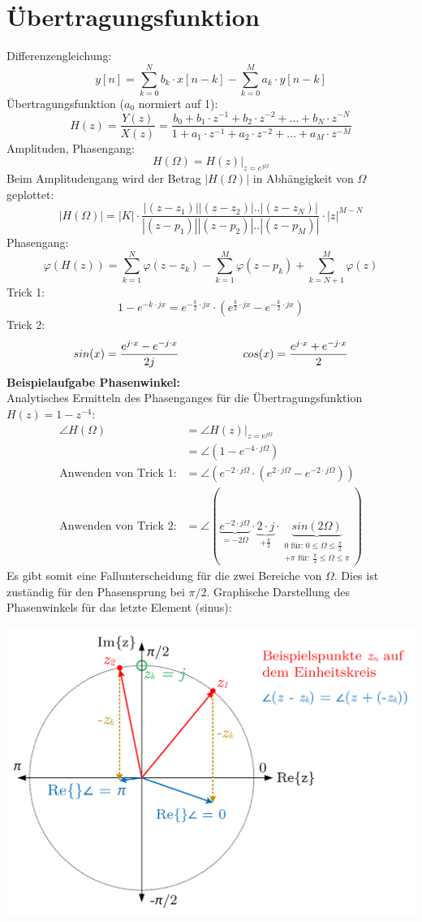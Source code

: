 \section{Übertragungsfunktion}
Differenzengleichung:
\[y[n] = \sum_{k=0}^{N}b_k \cdot x[n-k]-\sum_{k=0}^{M} a_k \cdot y[n-k]\]
Übertragungsfunktion ($a_0$ normiert auf 1):
\[ H(z) = \frac{Y(z)}{X(z)} =
\frac{b_0+b_1 \cdot z^{-1} + b_2 \cdot z^{-2}+\ldots+b_N \cdot z^{-N}}
	{1+a_1 \cdot z^{-1} + a_2 \cdot z^{-2}+\ldots+a_M \cdot z^{-M}} \]
Amplituden, Phasengang:
\[ H(\Omega)=H(z)\big|_{z=e^{j\Omega}} \]
Beim Amplitudengang wird der Betrag $\big| H(\Omega)\big|$ in Abhängigkeit von $\Omega$ geplottet:\\
\[ \big| H(\Omega)\big| =  |K| \cdot \frac{|(z-z_1)||(z-z_2)|..|(z-z_N)|}
								{|(z-p_1)||(z-p_2)|..|(z-p_M)|}
								\cdot |z|^{M-N} \]
Phasengang: \[ \varphi(H(z)) = \sum_{k=1}^{N} \varphi(z-z_k) 
								-\sum_{k=1}^{M} \varphi(z-p_k)
								+\sum_{k=N+1}^{M} \varphi(z)  \]
Trick 1:
\[ 1-e^{-k \cdot jx} = e^{-\frac{k}{2} \cdot jx} \cdot (e^{\frac{k}{2} \cdot jx} - e^{-\frac{k}{2} \cdot jx})\]
Trick 2:
\[ sin(x)= \frac{e^{j \cdot x}-e^{-j \cdot x}}{2j} \hspace{20mm} 
cos(x)= \frac{e^{j \cdot x}+e^{-j \cdot x}}{2} \]
\textbf{Beispielaufgabe Phasenwinkel:\\} 
Analytisches Ermitteln des Phasenganges für die Übertragungsfunktion $H(z) = 1-z^{-4}$:
\begin{align*}
\angle H(\Omega)		 	&=\angle H(z)\big|_{z=e^{j\Omega}} \\
											&=\angle (1-e^{-4 \cdot j\Omega}) \\
\text{Anwenden von Trick 1:} 		&= \angle(e^{-2 \cdot j\Omega} \cdot (e^{2 \cdot j\Omega} - e^{-2 \cdot j\Omega})) \\
\text{Anwenden von Trick 2:} 		&= \angle(\underbrace{e^{-2 \cdot j\Omega}}_{= -2\Omega} 
\cdot \underbrace{2 \cdot j}_{+\frac{\pi}{2}} \cdot \underbrace{sin(2\Omega)}_{
\substack{ {0    \text{ für: } 0\leq \Omega \leq \frac{\pi}{2}} \\ 
           {+\pi \text{ für: } \frac{\pi}{2} \leq \Omega \leq \pi}}})
\end{align*}
Es gibt somit eine Fallunterscheidung für die zwei Bereiche von $\Omega$. Dies ist zuständig für den Phasensprung bei $\pi/2$. 
Graphische Darstellung des Phasenwinkels für das letzte Element (sinus):
\begin{center}
	\includegraphics[width=.575\textwidth]{../fig/phasenwinkel_analyse}
\end{center}
